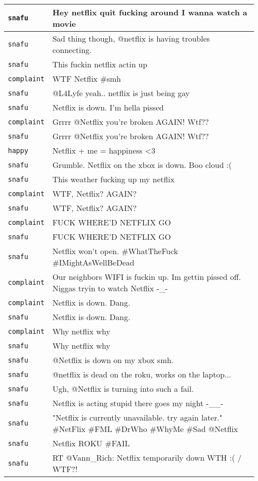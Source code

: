 {\begin{longtable}{|l|p{160mm}|}
      \tabularnewline\hline
         \texttt{snafu} & Hey netflix quit fucking around I wanna watch a movie
      \tabularnewline\hline
         \texttt{snafu} & Sad thing though, @netflix is having troubles connecting.
      \tabularnewline\hline
         \texttt{snafu} & This fuckin netflix actin up
      \tabularnewline\hline
         \texttt{complaint} & WTF Netflix \#smh
      \tabularnewline\hline
         \texttt{snafu} & @L4Lyfe yeah.. netflix is just being gay
      \tabularnewline\hline
         \texttt{snafu} & Netflix is down. I'm hella pissed
      \tabularnewline\hline
         \texttt{complaint} & Grrrr @Netflix you're broken AGAIN! Wtf??
      \tabularnewline\hline
         \texttt{snafu} & Grrrr @Netflix you're broken AGAIN! Wtf??
      \tabularnewline\hline
         \texttt{happy} & Netflix + me = happiness <3
      \tabularnewline\hline
         \texttt{snafu} & Grumble. Netflix on the xbox is down. Boo cloud :(
      \tabularnewline\hline
         \texttt{snafu} & This weather fucking up my netflix
      \tabularnewline\hline
         \texttt{complaint} & WTF, Netflix? AGAIN?
      \tabularnewline\hline
         \texttt{snafu} & WTF, Netflix? AGAIN?
      \tabularnewline\hline
         \texttt{complaint} & FUCK WHERE'D NETFLIX GO
      \tabularnewline\hline
         \texttt{snafu} & FUCK WHERE'D NETFLIX GO
      \tabularnewline\hline
         \texttt{snafu} & Netflix won't open. \#WhatTheFuck \#IMightAsWellBeDead
      \tabularnewline\hline
         \texttt{complaint} & Our neighbors WIFI is fuckin up. Im gettin pissed off. Niggas tryin to watch Netflix -\_-
      \tabularnewline\hline
         \texttt{complaint} & Netflix is down. Dang.
      \tabularnewline\hline
         \texttt{snafu} & Netflix is down. Dang.
      \tabularnewline\hline
         \texttt{complaint} & Why netflix why
      \tabularnewline\hline
         \texttt{snafu} & Why netflix why
      \tabularnewline\hline
         \texttt{snafu} & @Netflix is down on my xbox smh.
      \tabularnewline\hline
         \texttt{snafu} & @netflix is dead on the roku, works on the laptop...
      \tabularnewline\hline
         \texttt{snafu} & Ugh, @Netflix is turning into such a fail.
      \tabularnewline\hline
         \texttt{snafu} & Netflix is acting stupid there goes my night -\_\_-
      \tabularnewline\hline
         \texttt{snafu} & "Netflix is currently unavailable. try again later." \#NetFlix \#FML \#DrWho \#WhyMe \#Sad @Netflix
      \tabularnewline\hline
         \texttt{snafu} & Netflix ROKU \#FAIL
      \tabularnewline\hline
         \texttt{snafu} & RT @Vann\_Rich: Netflix temporarily down WTH :( / WTF?!

\end{longtable}}
